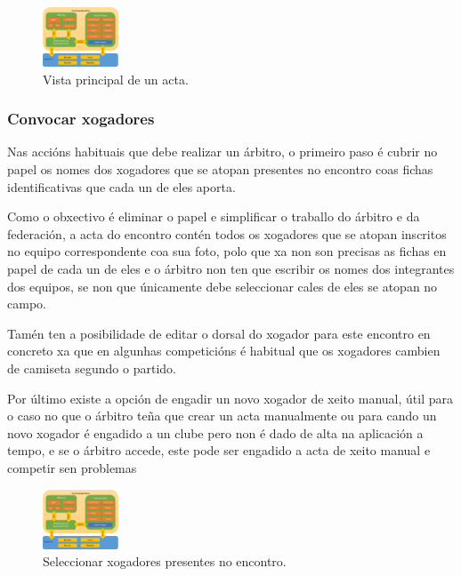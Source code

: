     \begin{figure}[h!]
      \begin{center}
      \includegraphics[width=0.2\textwidth]{./img/cordova_arquitectura.png}
      \caption{Vista principal de un acta.}
      \end{center}
    \end{figure}

      \subsubsection{Convocar xogadores}
      Nas accións habituais que debe realizar un árbitro, o 
primeiro paso é cubrir no papel os nomes dos xogadores que se atopan presentes 
no encontro coas fichas identificativas que cada un de eles aporta.

      Como o obxectivo é eliminar o papel e simplificar o traballo do árbitro 
e da federación, a acta do encontro contén todos os xogadores que 
se atopan inscritos no equipo correspondente coa sua foto, polo que xa non son 
precisas as fichas en papel de cada un de eles e o árbitro non ten que escribir 
os nomes dos integrantes dos equipos, se non que únicamente debe seleccionar 
cales de eles se atopan no campo.

      Tamén ten a posibilidade de editar o dorsal do xogador para este encontro 
en concreto xa que en algunhas competicións é habitual que os xogadores cambien 
de camiseta segundo o partido.

      Por último existe a opción de engadir un novo xogador de xeito 
manual, útil para o caso no que o árbitro teña que crear un acta manualmente ou 
para cando un novo xogador é engadido a un clube pero non é dado de alta na 
aplicación a tempo, e se o árbitro accede, este pode ser engadido a acta de 
xeito manual e competir sen problemas

    \begin{figure}[h!]
      \begin{center}
      \includegraphics[width=0.2\textwidth]{./img/cordova_arquitectura.png}
      \caption{Seleccionar xogadores presentes no encontro.}
      \end{center}
    \end{figure}

